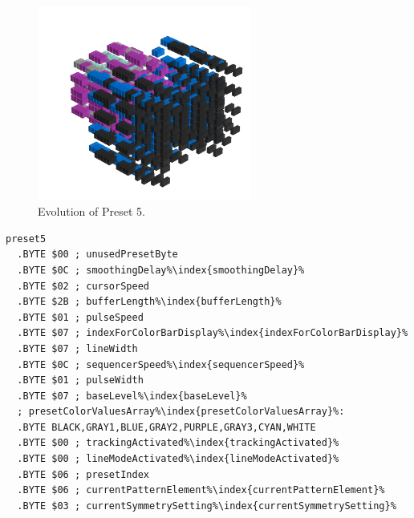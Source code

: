 \clearpage
\begin{minipage}[b]{0.48\linewidth}

\begin{figure}[H]                                                          
  \centering                                                             
  \begin{adjustbox}{width=7cm,center}                                   
  \includegraphics[width=7cm]{src/presets/pattern5-45.png}%
  \end{adjustbox}                                                        
\caption{Evolution of Preset 5.}                                           
\end{figure}                                                               
\end{minipage}
\hspace{0.1cm}
\begin{minipage}[b]{0.48\linewidth}                                       
                                                                           
\begin{lstlisting}[basicstyle=\ttfamily\scriptsize,caption=Data structure for Preset 5.,escapechar=\%]
preset5
  .BYTE $00 ; unusedPresetByte
  .BYTE $0C ; smoothingDelay%\index{smoothingDelay}%
  .BYTE $02 ; cursorSpeed
  .BYTE $2B ; bufferLength%\index{bufferLength}%
  .BYTE $01 ; pulseSpeed
  .BYTE $07 ; indexForColorBarDisplay%\index{indexForColorBarDisplay}%
  .BYTE $07 ; lineWidth
  .BYTE $0C ; sequencerSpeed%\index{sequencerSpeed}%
  .BYTE $01 ; pulseWidth
  .BYTE $07 ; baseLevel%\index{baseLevel}%
  ; presetColorValuesArray%\index{presetColorValuesArray}%: 
  .BYTE BLACK,GRAY1,BLUE,GRAY2,PURPLE,GRAY3,CYAN,WHITE
  .BYTE $00 ; trackingActivated%\index{trackingActivated}%
  .BYTE $00 ; lineModeActivated%\index{lineModeActivated}%
  .BYTE $06 ; presetIndex
  .BYTE $06 ; currentPatternElement%\index{currentPatternElement}%
  .BYTE $03 ; currentSymmetrySetting%\index{currentSymmetrySetting}%
\end{lstlisting}
\end{minipage}

